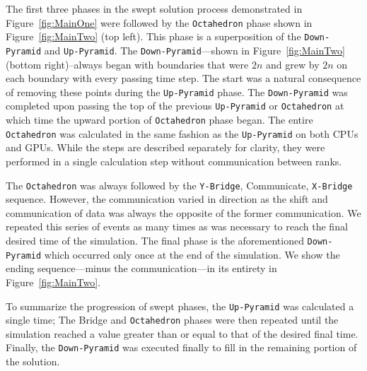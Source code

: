 \documentclass[preprints,article,accept,moreauthors,pdftex]{Definitions/mdpi}
\def\Up{\texttt{Up-Pyramid}}
\def\Down{\texttt{Down-Pyramid}}
\def\Oct{\texttt{Octahedron}}
\def\Xb{\texttt{X-Bridge}}
\def\Yb{\texttt{Y-Bridge}}
\begin{document}
\par
The first three phases in the swept solution process demonstrated in Figure~\ref{fig:MainOne} were followed by the \Oct{} phase shown in Figure~\ref{fig:MainTwo} (top left). This phase is a superposition of the \Down{} and \Up{}. The \Down{}---shown in Figure~\ref{fig:MainTwo} (bottom right)--always began with boundaries that were $2n$ and grew by $2n$ on each boundary with every passing time step. The start was a natural consequence of removing these points during the \Up{} phase. The \Down{} was completed upon passing the top of the previous \Up{} or \Oct{} at which time the upward portion of \Oct{} phase began. The entire \Oct{} was calculated in the same fashion as the \Up{} on both CPUs and GPUs. While the steps are described separately for clarity, they were performed in a single calculation step without communication between ranks. 

\par
The \Oct{} was always followed by the \Yb{}, Communicate, \Xb{} sequence. However, the communication varied in direction as the shift and communication of data was always the opposite of the former communication. We repeated this series of events as many times as was necessary to reach the final desired time of the simulation. The final phase is the aforementioned \Down{} which occurred only once at the end of the simulation. We show the ending sequence---minus the communication---in its entirety in Figure~\ref{fig:MainTwo}. 
\par
To summarize the progression of swept phases, the \Up{} was calculated a single time; The Bridge and \Oct{} phases were then repeated until the simulation reached a value greater than or equal to that of the desired final time. Finally, the \Down{} was executed finally to fill in the remaining portion of the solution.

\end{document}
